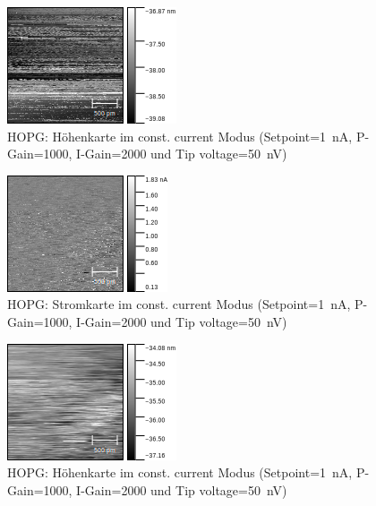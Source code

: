 \documentclass[sn-mathphys-num,iicol]{sn-jnl}
\theoremstyle{thmstyleone}
\theoremstyle{thmstyletwo}
\theoremstyle{thmstylethree}
\begin{document}
\begin{figure}[h]
        \centering
        \includegraphics[width=.5\textwidth]{../data/Graphit5_z.png}
        \caption{HOPG: Höhenkarte im const. current Modus (Setpoint=\SI{1}{\nano A}, P-Gain=\SI{1000}{}, I-Gain=\SI{2000}{} und Tip voltage=\SI{50}{\nano V})} \label{fig:gr2nm50nVz}
\end{figure}
\begin{figure}[h]
        \centering
        \includegraphics[width=.5\textwidth]{../data/Graphit6_current.png}
        \caption{HOPG: Stromkarte im const. current Modus (Setpoint=\SI{1}{\nano A}, P-Gain=\SI{1000}{}, I-Gain=\SI{2000}{} und Tip voltage=\SI{50}{\nano V})} \label{fig:gr2nm50nVc2}
\end{figure}
\begin{figure}[h]
        \centering
        \includegraphics[width=.5\textwidth]{../data/Graphit6_z.png}
        \caption{HOPG: Höhenkarte im const. current Modus (Setpoint=\SI{1}{\nano A}, P-Gain=\SI{1000}{}, I-Gain=\SI{2000}{} und Tip voltage=\SI{50}{\nano V})} \label{fig:gr2nm50nVz2}
\end{figure}
\end{document}
